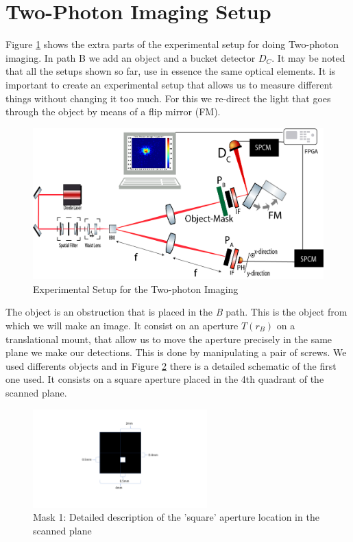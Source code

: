 \section{Two-Photon Imaging Setup}
Figure \ref{fig:ghostSetup} shows the extra parts of the experimental setup 
for doing Two-photon imaging. In path B we add an object and a bucket detector $D_C$. 
It may be noted that all the setups shown so far, use in essence the same optical elements.
 It is important to create an experimental setup that allows us to 
measure different things without changing it too much. For this we re-direct the light that 
goes through the object by means of a flip mirror (FM).

\begin{figure}[h!]
\centering
\includegraphics[width=1\textwidth]{Figures/ghostSetup2.png}
\caption{Experimental Setup for the Two-photon Imaging} 
\label{fig:ghostSetup}
\end{figure}


The object is an obstruction that is placed in the \textit{B} path. This is the object
from which we will make an image. It consist on an aperture $T(r_B)$ on a translational mount,
that allow us to move the aperture precisely in the same plane we make our detections.
This is done by manipulating a pair of screws. 
We used differents objects and in Figure \ref{fig:mask1}
there is a detailed schematic of the first one used. It consists on a square aperture placed in the 4th 
quadrant of the scanned plane. 

\begin{figure}[h!]
\centering
 \includegraphics[width=0.6\textwidth]{Figures/mask1.pdf}
 \caption{Mask 1: Detailed description of the 'square' aperture location in the scanned plane}
\label{fig:mask1} 
\end{figure}

